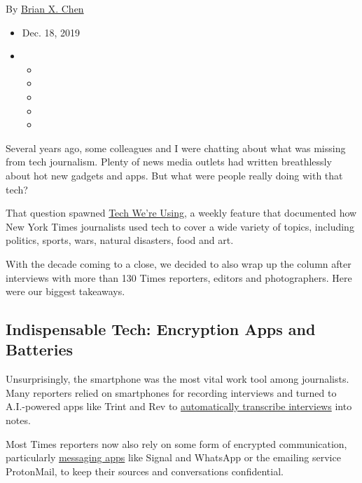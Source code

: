 By \href{https://www.nytimes3xbfgragh.onion/by/brian-x-chen}{Brian X.
Chen}

\begin{itemize}
\item
  Dec. 18, 2019
\item
  \begin{itemize}
  \item
  \item
  \item
  \item
  \item
  \end{itemize}
\end{itemize}

Several years ago, some colleagues and I were chatting about what was
missing from tech journalism. Plenty of news media outlets had written
breathlessly about hot new gadgets and apps. But what were people really
doing with that tech?

That question spawned
\href{https://www.nytimes3xbfgragh.onion/column/tech-we-are-using}{Tech
We're Using}, a weekly feature that documented how New York Times
journalists used tech to cover a wide variety of topics, including
politics, sports, wars, natural disasters, food and art.

With the decade coming to a close, we decided to also wrap up the column
after interviews with more than 130 Times reporters, editors and
photographers. Here were our biggest takeaways.

\hypertarget{indispensable-tech-encryption-apps-and-batteries}{%
\subsection{Indispensable Tech: Encryption Apps and
Batteries}\label{indispensable-tech-encryption-apps-and-batteries}}

Unsurprisingly, the smartphone was the most vital work tool among
journalists. Many reporters relied on smartphones for recording
interviews and turned to A.I.-powered apps like Trint and Rev to
\href{https://www.nytimes3xbfgragh.onion/2019/08/21/technology/personaltech/how-to-turn-an-iphone-into-a-work-only-tool.html}{automatically
transcribe interviews} into notes.

Most Times reporters now also rely on some form of encrypted
communication, particularly
\href{https://www.nytimes3xbfgragh.onion/2017/11/15/technology/personaltech/messaging-apps-katie-benner.html}{messaging
apps} like Signal and WhatsApp or the emailing service ProtonMail, to
keep their sources and conversations confidential.

